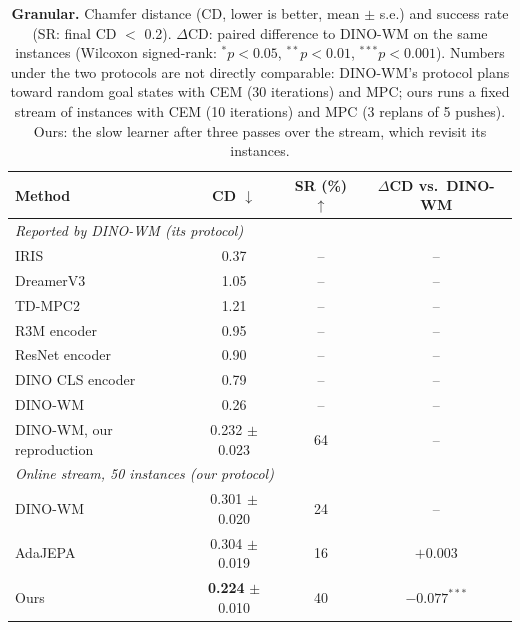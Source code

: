\begin{table}[t]
\centering
\small
\caption{\textbf{Granular.} Chamfer distance (CD, lower is better, mean $\pm$ s.e.) and success rate (SR: final CD $<$ 0.2). $\Delta$CD: paired difference to DINO-WM on the same instances (Wilcoxon signed-rank: $^{*}p<0.05$, $^{**}p<0.01$, $^{***}p<0.001$). Numbers under the two protocols are not directly comparable: DINO-WM's protocol plans toward random goal states with CEM (30 iterations) and MPC; ours runs a fixed stream of instances with CEM (10 iterations) and MPC (3 replans of 5 pushes). Ours: the slow learner after three passes over the stream, which revisit its instances.}
\label{tab:granular}
\begin{tabular}{lccc}
\toprule
Method & CD $\downarrow$ & SR (\%) $\uparrow$ & $\Delta$CD vs.\ DINO-WM \\
\midrule
\multicolumn{4}{l}{\textit{Reported by DINO-WM (its protocol)}} \\
\quad IRIS & 0.37 & -- & -- \\
\quad DreamerV3 & 1.05 & -- & -- \\
\quad TD-MPC2 & 1.21 & -- & -- \\
\quad R3M encoder & 0.95 & -- & -- \\
\quad ResNet encoder & 0.90 & -- & -- \\
\quad DINO CLS encoder & 0.79 & -- & -- \\
\quad DINO-WM & 0.26 & -- & -- \\
\quad DINO-WM, our reproduction & 0.232 $\pm$ 0.023 & 64 & -- \\
\midrule
\multicolumn{4}{l}{\textit{Online stream, 50 instances (our protocol)}} \\
\quad DINO-WM & 0.301 $\pm$ 0.020 & 24 & -- \\
\quad AdaJEPA & 0.304 $\pm$ 0.019 & 16 & $+0.003$ \\
\quad Ours & \textbf{0.224} $\pm$ 0.010 & 40 & $-0.077^{***}$ \\
\bottomrule
\end{tabular}
\end{table}

